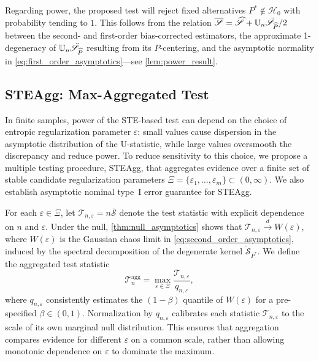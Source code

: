 \documentclass{article}
\theoremstyle{plain}
\theoremstyle{definition}
\theoremstyle{remark}
\newcommand{\U}{\mathbb{U}}
\newcommand{\cT}{\mathcal{T}}
\newcommand{\ucH}{\mathscr{H}}
\newcommand{\wh}[1]{\widehat{#1}}
\newcommand{\hP}{\widehat{P}}
\newcommand{\1}{\mathbbm{1}}
\newcommand{\STE}{\mathscr{S}}
\newcommand{\eps}{\varepsilon}
\theoremstyle{plain}
\theoremstyle{definition}
\begin{document}
Regarding power, the proposed test will reject fixed alternatives $P^*\not\in \ucH_0$ with probability tending to $1$. This follows from the relation $\overline{\STE}=\wh{\STE} + \U_n \Ddot{\STE}_{\hP}/2$ between the second- and first-order bias-corrected estimators, the approximate 1-degeneracy of $\U_n\Ddot{\STE}_{\hP}$ resulting from its $\hP$-centering, and the asymptotic normality in \eqref{eq:first_order_asymptotics}---see \cref{lem:power_result}.

\subsection{STEAgg: Max-Aggregated Test}\label{sec:STEAgg}

In finite samples, power of the STE-based test can depend on the choice of entropic regularization parameter $\eps$: small values cause dispersion in the asymptotic distribution of the U-statistic, while large values oversmooth the discrepancy and reduce power. To reduce sensitivity to this choice, we propose a multiple testing procedure, STEAgg, that aggregates evidence over a finite set of stable candidate regularization parameters $\Xi=\{\eps_1,\dots,\eps_m\}\subset(0,\infty)$. We also establish asymptotic nominal type~I error guarantee for STEAgg. 

For each $\eps\in\Xi$, let $\cT_{n,\eps}=n\overline{\STE}$ denote the test statistic with explicit dependence on $n$ and $\eps$. Under the null, \cref{thm:null_asymptotics} shows that $\cT_{n,\eps}\xrightarrow{d} W(\eps)$, where $W(\eps)$ is the Gaussian chaos limit in \eqref{eq:second_order_asymptotics}, induced by the spectral decomposition of the degenerate kernel $\ddot{\STE}_{P^*}$. We define the aggregated test statistic
\begin{equation}
\label{eq:STEAgg}
\mathcal T_n^{\mathrm{agg}}
=
\max_{\eps \in \Xi}\frac{\mathcal T_{n,\eps}}{q_{n,\eps}},
\end{equation}
where $q_{n,\eps}$ consistently estimates the $(1-\beta)$ quantile of $W(\eps)$ for a pre-specified $\beta\in(0,1)$. Normalization by $q_{n, \eps}$ calibrates each statistic $\cT_{n, \eps}$ to the scale of its own marginal null distribution. This ensures that aggregation compares evidence for different $\eps$ on a common scale, rather than allowing monotonic dependence on $\eps$ to dominate the maximum.
\end{document}
